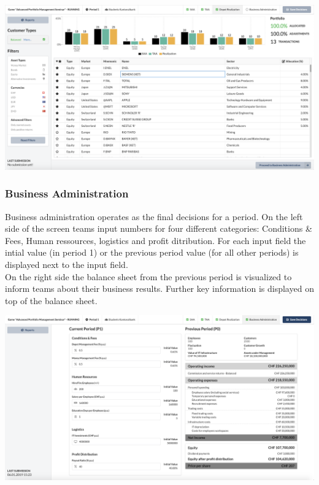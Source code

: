 \begin{center}
  \includegraphics[scale=0.2]{img/application-overview/teams/05_depot_realization.png}
\end{center}

\subsubsection{Business Administration}
Business administration operates as the final decisions for a period. On the left side of the screen teams input numbers for four different categories: Conditions \& Fees, Human ressources, logistics and profit ditribution. For each input field the intial value (in period 1) or the previous period value (for all other periods) is displayed next to the input field.\\

On the right side the balance sheet from the previous period is visualized to inform teams about their business results. Further key information is displayed on top of the balance sheet.
\begin{center}
  \includegraphics[scale=0.2]{img/application-overview/teams/06_business.png}
\end{center}

